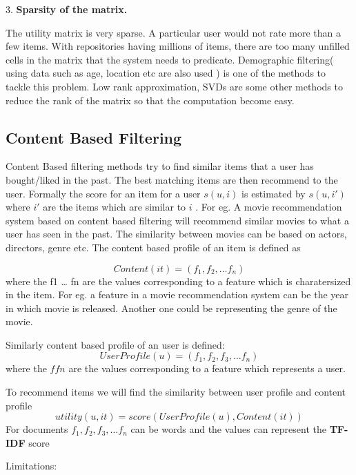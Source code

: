 3. {\bf Sparsity of the matrix.}

The utility matrix is very sparse. A particular user would not rate more than a few items. With repositories having millions of items, there are too many unfilled cells in the matrix that the system needs to predicate. Demographic filtering( using data such as age, location etc are also used ) is one of the methods to tackle this problem. Low rank approximation, SVDs are some other methods to reduce the rank of the matrix so that the computation become easy. 

\subsection{Content Based Filtering}

Content Based filtering methods try to find similar items that a user has bought/liked in the past. The best matching items are then recommend to the user. Formally the score for an item for a user $s(u,i)$ is estimated by $s(u,i')$ where $i'$ are the items which are similar to $i$ . For eg. A movie recommendation system based on content based filtering will recommend similar movies to what a user has seen in the past. The similarity between movies can be based on actors, directors, genre etc. The content based profile of an item is defined as

\begin{equation}
Content(it) = (f_1,f_2,\dots f_n) 
\end{equation}
where the f1 … fn are the values corresponding to a feature which is charatersized in the item. For eg. a feature in a movie recommendation system can be the year in which movie is released. Another one could be representing the genre of the movie.

Similarly content based profile of an user is defined:
\begin{equation}
UserProfile(u) = (f_1,f_2,f_3,\dots f_n)
\end{equation}
where the $f fn$ are the values corresponding to a feature which represents a user.

To recommend items we will find the similarity between user profile and content profile
\begin{equation}
utility(u,it) = score(UserProfile(u), Content(it))
\end{equation}
For documents $f_1,f_2,f_3,\dots f_n$ can be words and the values can represent the {\bf TF-IDF} score

Limitations:

